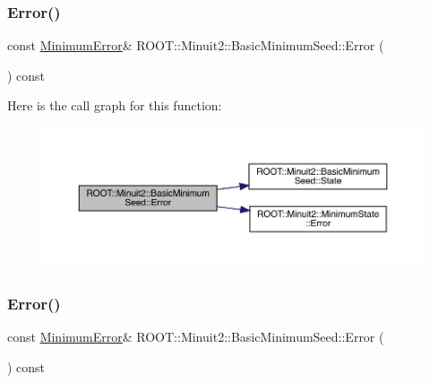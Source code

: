 \subsubsection{\texorpdfstring{Error()}{Error()}\hspace{0.1cm}{\footnotesize\ttfamily [1/2]}}
{\footnotesize\ttfamily const \mbox{\hyperlink{classROOT_1_1Minuit2_1_1MinimumError}{Minimum\+Error}}\& R\+O\+O\+T\+::\+Minuit2\+::\+Basic\+Minimum\+Seed\+::\+Error (\begin{DoxyParamCaption}{ }\end{DoxyParamCaption}) const\hspace{0.3cm}{\ttfamily [inline]}}

Here is the call graph for this function\+:
\nopagebreak
\begin{figure}[H]
\begin{center}
\leavevmode
\includegraphics[width=350pt]{de/d50/classROOT_1_1Minuit2_1_1BasicMinimumSeed_a108de61cfe9f1766c3d7e251202a29df_cgraph}
\end{center}
\end{figure}
\mbox{\label{classROOT_1_1Minuit2_1_1BasicMinimumSeed_a108de61cfe9f1766c3d7e251202a29df}} 
\subsubsection{\texorpdfstring{Error()}{Error()}\hspace{0.1cm}{\footnotesize\ttfamily [2/2]}}
{\footnotesize\ttfamily const \mbox{\hyperlink{classROOT_1_1Minuit2_1_1MinimumError}{Minimum\+Error}}\& R\+O\+O\+T\+::\+Minuit2\+::\+Basic\+Minimum\+Seed\+::\+Error (\begin{DoxyParamCaption}{ }\end{DoxyParamCaption}) const\hspace{0.3cm}{\ttfamily [inline]}}

